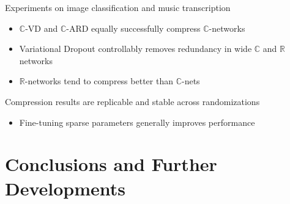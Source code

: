 \documentclass{beamer}
\newcommand{\real}{\mathbb{R}}
\newcommand{\cplx}{\mathbb{C}}
\begin{document}
\begin{frame}[c]{\insertsection}
Experiments on image classification and music transcription
\begin{itemize}
  \item $\cplx$-VD and $\cplx$-ARD equally successfully compress $\cplx$-networks
  \smallskip
  \item Variational Dropout controllably removes redundancy in wide $\cplx$ and $\real$ networks
  \smallskip
  \item $\real$-networks tend to compress better than $\cplx$-nets
\end{itemize}

\bigskip
Compression results are replicable and stable across randomizations
\begin{itemize}
  \item Fine-tuning sparse parameters generally improves performance
\end{itemize}
\end{frame}


\section{Conclusions and Further Developments} %
\label{sec:conclusions_and_further_developments}
\end{document}
